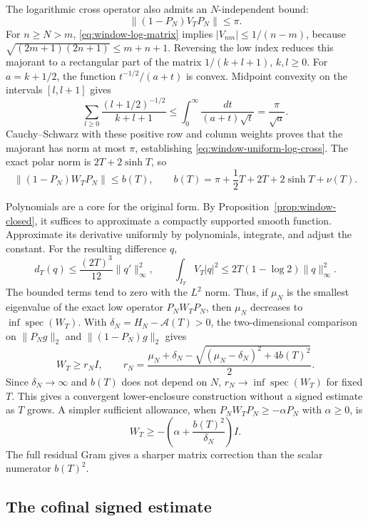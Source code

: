 \documentclass[11pt]{article}
\theoremstyle{definition}
\theoremstyle{remark}
\numberwithin{equation}{section}
\begin{document}
The logarithmic cross operator also admits an $N$-independent bound:
\begin{equation}
 \|(1-P_N)V_TP_N\|\le\pi.
 \label{eq:window-uniform-log-cross}
\end{equation}
For $n\ge N>m$, \eqref{eq:window-log-matrix} implies
$|V_{nm}|\le1/(n-m)$, because
$\sqrt{(2m+1)(2n+1)}\le m+n+1$.
Reversing the low index reduces this majorant to a rectangular
part of the matrix $1/(k+l+1)$, $k,l\ge0$.
For $a=k+1/2$, the function $t^{-1/2}/(a+t)$ is convex.
Midpoint convexity on the intervals $[l,l+1]$ gives
\[
 \sum_{l\ge0}\frac{(l+1/2)^{-1/2}}{k+l+1}
  \le\int_0^\infty\frac{dt}{(a+t)\sqrt t}
  =\frac\pi{\sqrt a}.
\]
Cauchy--Schwarz with these positive row and column weights proves
that the majorant has norm at most $\pi$, establishing
\eqref{eq:window-uniform-log-cross}.
The exact polar norm is $2T+2\sinh T$, so
\begin{equation}
 \|(1-P_N)W_TP_N\|\le b(T),
 \qquad b(T)=\pi+\frac12T+2T+2\sinh T+\nu(T).
 \label{eq:window-uniform-cross}
\end{equation}

Polynomials are a core for the original form.  By
Proposition~\ref{prop:window-closed}, it suffices to approximate
a compactly supported smooth function.  Approximate its derivative
uniformly by polynomials, integrate, and adjust the constant.
For the resulting difference $q$,
\[
 d_T(q)\le\frac{(2T)^3}{12}\|q'\|_\infty^2,
 \qquad
 \int_{I_T}V_T|q|^2\le2T(1-\log2)\|q\|_\infty^2.
\]
The bounded terms tend to zero with the $L^2$ norm.
Thus, if $\mu_N$ is the smallest eigenvalue of the exact low
operator $P_NW_TP_N$, then $\mu_N$ decreases to
$\inf\operatorname{spec}(W_T)$.
With $\delta_N=H_N-\mathcal A(T)>0$, the two-dimensional
comparison on $\|P_Ng\|_2$ and $\|(1-P_N)g\|_2$ gives
\begin{equation}
 W_T\ge r_N I,\qquad
 r_N=\frac{\mu_N+\delta_N-
       \sqrt{(\mu_N-\delta_N)^2+4b(T)^2}}2.
 \label{eq:window-galerkin-convergence}
\end{equation}
Since $\delta_N\to\infty$ and $b(T)$ does not depend on $N$,
$r_N\to\inf\operatorname{spec}(W_T)$ for fixed $T$.
This gives a convergent lower-enclosure construction without a
signed estimate as $T$ grows.  A simpler sufficient allowance,
when $P_NW_TP_N\ge-\alpha P_N$ with $\alpha\ge0$, is
\[
 W_T\ge-\left(\alpha+\frac{b(T)^2}{\delta_N}\right)I.
\]
The full residual Gram gives a sharper matrix correction than
the scalar numerator $b(T)^2$.

\subsection{The cofinal signed estimate}
\end{document}
